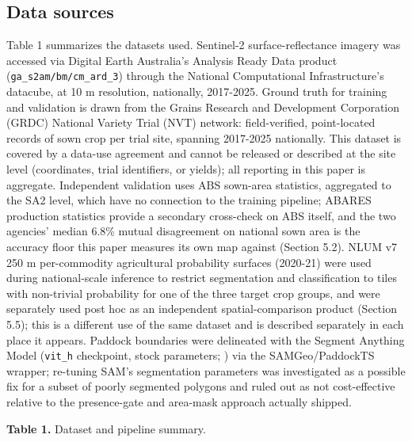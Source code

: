 \subsection{Data sources}\label{data-sources}

Table 1 summarizes the datasets used. Sentinel-2 surface-reflectance imagery was accessed via Digital Earth Australia's Analysis Ready Data product (\texttt{ga\_s2am/bm/cm\_ard\_3}) through the National Computational Infrastructure's datacube, at 10 m resolution, nationally, 2017-2025. Ground truth for training and validation is drawn from the Grains Research and Development Corporation (GRDC) National Variety Trial (NVT) network: field-verified, point-located records of sown crop per trial site, spanning 2017-2025 nationally. This dataset is covered by a data-use agreement and cannot be released or described at the site level (coordinates, trial identifiers, or yields); all reporting in this paper is aggregate. Independent validation uses ABS sown-area statistics, aggregated to the SA2 level, which have no connection to the training pipeline; ABARES production statistics provide a secondary cross-check on ABS itself, and the two agencies' median 6.8\% mutual disagreement on national sown area is the accuracy floor this paper measures its own map against (Section 5.2). NLUM v7 250 m per-commodity agricultural probability surfaces (2020-21) were used during national-scale inference to restrict segmentation and classification to tiles with non-trivial probability for one of the three target crop groups, and were separately used post hoc as an independent spatial-comparison product (Section 5.5); this is a different use of the same dataset and is described separately in each place it appears. Paddock boundaries were delineated with the Segment Anything Model (\texttt{vit\_h} checkpoint, stock parameters; \citealp{kirillov2023sam}) via the SAMGeo/PaddockTS wrapper; re-tuning SAM's segmentation parameters was investigated as a possible fix for a subset of poorly segmented polygons and ruled out as not cost-effective relative to the presence-gate and area-mask approach actually shipped.

\textbf{Table 1.} Dataset and pipeline summary.

